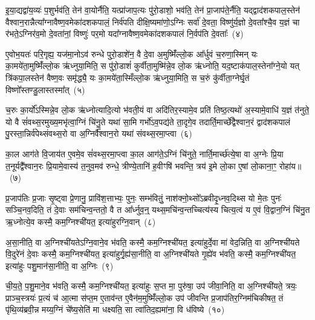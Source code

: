 इ॒या॒द्यद्वा॑य॒व्यः॑ प॒शुर्भव॑ति॒ तेन॑ वा॒योर्नैति॒ यत्प्रा॑जाप॒त्यः पु॑रो॒डाशो॒ भव॑ति॒ तेन॑ प्रा॒जाप॑ते॒र्नैति॒ यद्द्वाद॑श\-कपाल॒स्तेन॑ वैश्वान॒रान्नैत्या᳚ग्नावैष्ण॒वमेका॑\-दश\-कपालं॒ निर्व॑पति दीक्षि॒ष्यमा॑णो॒\-ऽग्निः सर्वा॑ दे॒वता॒ विष्णु॑र्य॒ज्ञो दे॒वता᳚श्चै॒व य॒ज्ञं चा र॑भते॒\-ऽग्निर॑व॒मो दे॒वता॑नां॒ विष्णुः॑ पर॒मो यदा᳚ग्नावैष्ण॒वमेका॑\-दश\-कपालं नि॒र्वप॑ति दे॒वताः᳚~(४)

ए॒वोभ॒यतः॑ परि॒गृह्य॒ यज॑मा॒नो\-ऽव॑ रुन्धे पुरो॒डाशे॑न॒ वै दे॒वा अ॒मुष्मिँ॑ल्लो॒क आ᳚र्धुवं च॒रुणा॒स्मिन् यः का॒मये॑ता॒मुष्मिँ॑ल्लो॒क ऋ॑ध्नुया॒मिति॒ स पु॑रो॒डाशं॑ कुर्वीता॒मुष्मि॑न्ने॒व लो॒क ऋ॑ध्नोति॒ यद॒ष्टाक॑पाल॒स्तेना᳚ग्ने॒यो यत् त्रि॑कपा॒लस्तेन॑ वैष्ण॒वः समृ॑द्ध्यै॒ यः का॒मये॑ता॒स्मिँल्लो॒क ऋ॑ध्नुया॒मिति॒ स च॒रुं कु॑र्वीता॒ग्नेर्घृ॒तं विष्णो᳚स्तण्डु॒लास्तस्मा᳚त्~(५)

च॒रुः का॒र्यो᳚\-ऽस्मिन्ने॒व लो॒क ऋ॑ध्नोत्यादि॒त्यो भ॑वती॒यं वा अदि॑तिर॒स्यामे॒व प्रति॑ तिष्ठ॒त्यथो॑ अ॒स्यामे॒वाधि॑ य॒ज्ञं त॑नुते॒ यो वै सं॑वथ्स॒रमुख्य॒मभृ॑त्वा॒ग्निं चि॑नु॒ते यथा॑ सा॒मि गर्भो॑\-ऽव॒पद्य॑ते ता॒दृगे॒व तदार्ति॒मार्च्छे᳚द्वैश्वान॒रं द्वाद॑श\-कपालं पु॒रस्ता॒न्निर्व॑पेथ्संवथ्स॒रो वा अ॒ग्निर्वै᳚श्वान॒रो यथा॑ संवथ्स॒रमा॒प्त्वा~(६)

का॒ल आग॑ते वि॒जाय॑त ए॒वमे॒व सं॑वथ्स॒रमा॒प्त्वा का॒ल आग॑ते॒\-ऽग्निं चि॑नुते॒ नार्ति॒मार्च्छ॑त्ये॒षा वा अ॒ग्नेः प्रि॒या त॒नूर्यद्वै᳚श्वान॒रः प्रि॒यामे॒वास्य॑ त॒नुव॒मव॑ रुन्धे॒ त्रीण्ये॒तानि॑ ह॒वीꣳषि॑ भवन्ति॒ त्रय॑ इ॒मे लो॒का ए॒षां लो॒काना॒ꣳ॒ रोहा॑य॥~(७)

{\anuvakamend[{य॒द्रिय॑ङ्वा॒युर्यच्छ्म॑श्रु॒णस्तद्वा॒योर्नि॒र्वप॑ति दे॒वता॒स्तस्मा॑दा॒प्त्वाष्टात्रिꣳ॑शच्च}]}%

प्र॒जा\-प॑तिः प्र॒जाः सृ॒ष्ट्वा प्रे॒णानु॒ प्रावि॑श॒त्ताभ्यः॒ पुनः॒ सम्भ॑वितुं॒ नाश॑क्नो॒थ्सो᳚\-ऽब्रवीदृ॒ध्नव॒दिथ्स यो मे॒तः पुनः॑ सञ्चि॒नव॒दिति॒ तं दे॒वाः सम॑चिन्व॒न्ततो॒ वै त आ᳚र्ध्नुव॒न्॒ यथ्स॒मचि॑न्व॒न्तच्चित्य॑स्य चित्य॒त्वं य ए॒वं वि॒द्वान॒ग्निं चि॑नु॒त ऋ॒ध्नोत्ये॒व कस्मै॒ कम॒ग्निश्ची॑यत॒ इत्या॑हुरग्नि॒वान्~(८)

अ॒सा॒नीति॒ वा अ॒ग्निश्ची॑यते\-ऽग्नि॒वाने॒व भ॑वति॒ कस्मै॒ कम॒ग्निश्ची॑यत॒ इत्या॑हुर्दे॒वा मा॑ वेद॒न्निति॒ वा अ॒ग्निश्ची॑यते वि॒दुरे॑नं दे॒वाः कस्मै॒ कम॒ग्निश्ची॑यत॒ इत्या॑हुर्गृ॒ह्य॑सा॒नीति॒ वा अ॒ग्निश्ची॑यते गृ॒ह्ये॑व भ॑वति॒ कस्मै॒ कम॒ग्निश्ची॑यत॒ इत्या॑हुः पशु॒मान॑सा॒नीति॒ वा अ॒ग्निः~(९)

ची॒य॒ते॒ प॒शु॒माने॒व भ॑वति॒ कस्मै॒ कम॒ग्निश्ची॑यत॒ इत्या॑हुः स॒प्त मा॒ पुरु॑षा॒ उप॑ जीवा॒निति॒ वा अ॒ग्निश्ची॑यते॒ त्रयः॒ प्राञ्च॒स्त्रयः॑ प्र॒त्यं च॑ आ॒त्मा स॑प्त॒म ए॒ताव॑न्त ए॒वैन॑म॒मुष्मिँ॑ल्लो॒क उप॑ जीवन्ति प्र॒जा\-प॑तिर॒ग्निम॑चिकीषत॒ तं पृ॑थि॒व्य॑ब्रवी॒न्न मय्य॒ग्निं चे᳚ष्य॒सेति॑ मा धक्ष्यति॒ सा त्वा॑तिद॒ह्यमा॑ना॒ वि ध॑विष्ये~(१०)

